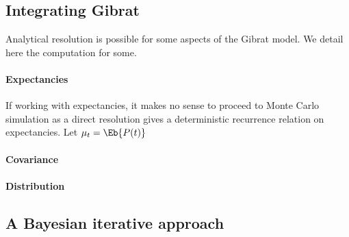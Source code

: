 \subsection{Integrating Gibrat}

Analytical resolution is possible for some aspects of the Gibrat model. We detail here the computation for some.

\paragraph{Expectancies} If working with expectancies, it makes no sense to proceed to Monte Carlo simulation as a direct resolution gives a deterministic recurrence relation on expectancies. Let $\mu_t = \Eb{P(t)}$

\paragraph{Covariance}


\paragraph{Distribution}



\subsection{A Bayesian iterative approach}











